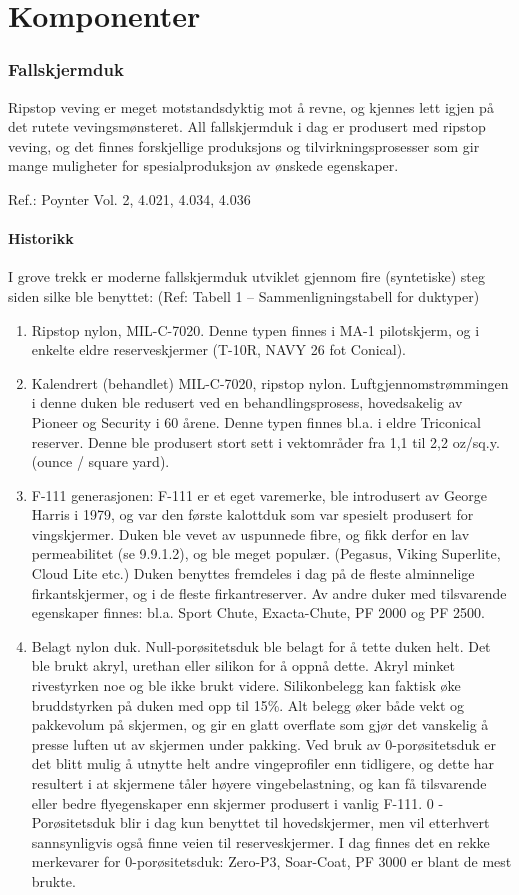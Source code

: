 \part{Komponenter}

\section{Fallskjermduk}
Ripstop veving er meget motstandsdyktig mot å revne, og kjennes lett igjen på det rutete vevingsmønsteret. All fallskjermduk i dag er produsert med ripstop veving, og det finnes forskjellige produksjons og tilvirkningsprosesser som gir mange muligheter for spesialproduksjon av ønskede egenskaper.

Ref.: Poynter Vol. 2, 4.021, 4.034, 4.036

\subsection{Historikk}
I grove trekk er moderne fallskjermduk utviklet gjennom fire (syntetiske) steg siden silke ble benyttet: (Ref: Tabell 1 – Sammenligningstabell for duktyper)
\begin{enumerate}
	\item Ripstop nylon, MIL-C-7020. Denne typen finnes i MA-1 pilotskjerm, og i enkelte eldre reserveskjermer (T-10R, NAVY 26 fot Conical).
	\item Kalendrert (behandlet) MIL-C-7020, ripstop nylon. Luftgjennomstrømmingen i denne duken ble redusert ved en behandlingsprosess, hovedsakelig av Pioneer og Security i 60 årene. Denne typen finnes bl.a. i eldre Triconical reserver. Denne ble produsert stort sett i vektområder fra 1,1 til 2,2 oz/sq.y. (ounce / square yard).
	\item F-111 generasjonen: F-111 er et eget varemerke, ble introdusert av George Harris i 1979, og var den første kalottduk som var spesielt produsert for vingskjermer. Duken ble vevet av uspunnede fibre, og fikk derfor en lav permeabilitet (se 9.9.1.2), og ble meget populær. (Pegasus, Viking Superlite, Cloud Lite etc.) Duken benyttes fremdeles i dag på de fleste alminnelige firkantskjermer, og i de fleste firkantreserver. Av andre duker med tilsvarende egenskaper finnes: bl.a. Sport Chute, Exacta-Chute, PF 2000 og PF 2500.
	\item Belagt nylon duk. Null-porøsitetsduk ble belagt for å tette duken helt. Det ble brukt akryl, urethan eller silikon for å oppnå dette. Akryl minket rivestyrken noe og ble ikke brukt videre. Silikonbelegg kan faktisk øke bruddstyrken på duken med opp til 15\%. Alt belegg øker både vekt og pakkevolum på skjermen, og gir en glatt overflate som gjør det vanskelig å presse luften ut av skjermen under pakking.
	Ved bruk av 0-porøsitetsduk er det blitt mulig å utnytte helt andre vingeprofiler enn tidligere, og dette har resultert i at skjermene tåler høyere vingebelastning, og kan få tilsvarende eller bedre flyegenskaper enn skjermer produsert i vanlig F-111.
	0 - Porøsitetsduk blir i dag kun benyttet til hovedskjermer, men vil etterhvert sannsynligvis også finne veien til reserveskjermer. I dag finnes det en rekke merkevarer for 0-porøsitetsduk: Zero-P3, Soar-Coat, PF 3000 er blant de mest brukte.
\end{enumerate}

